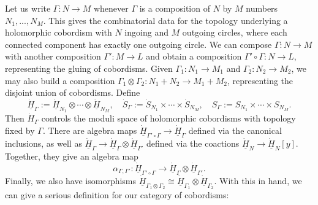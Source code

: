 \documentclass[11pt]{report}
\theoremstyle{definition}
\theoremstyle{remark}
\theoremstyle{remark}
\begin{document}
Let us write $\Gamma: N \to M$ whenever $\Gamma$ is a composition of $N$ by $M$ numbers $N_1,...,N_M$. This gives the combinatorial data for the topology underlying a holomorphic cobordism with $N$ ingoing and $M$ outgoing circles, where each connected component has exactly one outgoing circle. We can compose $\Gamma: N \to M$ with another composition $\Gamma': M \to L$ and obtain a composition $\Gamma' \circ \Gamma: N \to L$, representing the gluing of cobordisms. Given $\Gamma_1: N_1 \to M_1$ and $\Gamma_2: N_2 \to M_2$, we may also build a composition $\Gamma_1 \otimes \Gamma_2: N_1+N_2 \to M_1+M_2$, representing the disjoint union of cobordisms. Define
\begin{equation*}
\underline{\dot H}_\Gamma := \underline{\dot H}_{N_1} \otimes \cdots \otimes \underline{\dot H}_{N_M}, \quad \dot S_\Gamma := \dot S_{N_1} \times \cdots \times \dot S_{N_M}, \quad S_\Gamma := S_{N_1} \times \cdots \times S_{N_M}.
\end{equation*}
Then $\dot H_\Gamma$ controls the moduli space of holomorphic cobordisms with topology fixed by $\Gamma$. There are algebra maps $\underline{\dot H}_{\Gamma' \circ \Gamma} \to \underline{\dot H}_\Gamma$ defined via the canonical inclusions, as well as $\underline{\dot H}_\Gamma \to \underline{\dot H}_\Gamma \otimes \underline{\dot H}_{\Gamma'}$ defined via the coactions $\underline{\dot H}_N \to \underline{\dot H}_N[y]$. Together, they give an algebra map
\begin{equation*}
\alpha_{\Gamma,\Gamma'}: \underline{\dot H}_{\Gamma' \circ \Gamma} \to \underline{\dot H}_\Gamma \otimes \underline{\dot H}_{\Gamma'}.
\end{equation*}
Finally, we also have isomorphisms $\underline{\dot H}_{\Gamma_1 \otimes \Gamma_2} \cong \underline{\dot H}_{\Gamma_1} \otimes \underline{\dot H}_{\Gamma_2}$. With this in hand, we can give a serious definition for our category of cobordisms:
\end{document}
